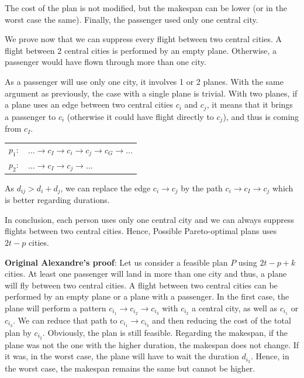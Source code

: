 \documentclass{llncs}
\begin{document}
The cost of the plan is not modified, but the makespan can be lower (or in the worst case the same). Finally, the passenger used only one central city.

We prove now that we can suppress every flight between two central cities. A flight between 2 central cities is performed by an empty plane. Otherwise, a passenger would have flown through more than one city.

As a passenger will use only one city, it involves 1 or 2 planes. With the same argument as previously, the case with a single plane is trivial. With two planes, if a plane uses an edge between two central cities $c_i$ and $c_j$, it means that it brings a passenger to $c_i$ (otherwise it could have flight directly to $c_j$), and thus is coming from $c_I$. 

\begin{center}
\begin{tabular}{c l}
    $p_1:$ & $\ldots \to c_I \to c_i \to c_j \to c_G \to \ldots$\\
    $p_2:$ & $\ldots \to c_I \to c_j \to \ldots$\\
\end{tabular}
\end{center}

As $d_{ij} > d_i + d_j$, we can replace the edge $c_i \to c_j$ by the path $c_i \to c_I \to c_j$ which is better regarding durations.

In conclusion, each person uses only one central city and we can always suppress flights between two central cities. Hence, Possible Pareto-optimal plans uses $2t-p$ cities.

{\bf Original Alexandre's proof}: Let us consider a feasible plan $P$ using $2t-p+k$ cities. At least one passenger will land in more than one city and thus, a plane will fly between two central cities. A flight between two central cities can be performed by an empty plane or a plane with a passenger. In the first case, the plane will perform a pattern $c_{i_1} \to c_{i_2} \to c_{i_3}$ with $c_{i_2}$ a central city, as well as $c_{i_1}$ or $c_{i_3}$. We can reduce that path to $c_{i_1} \to c_{i_3}$ and then reducing the cost of the total plan by $c_{i_2}$. Obviously, the plan is still feasible. Regarding the makespan, if the plane was not the one with the higher duration, the makespan does not change. If it was, in the worst case, the plane will have to wait the duration $d_{i_2}$. Hence, in the worst case, the makespan remains the same but cannot be higher.
\end{document}
